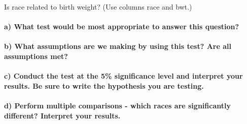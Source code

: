 \documentclass[
]{article}
\begin{document}
Is race related to birth weight? (Use columns race and bwt.)

\hypertarget{a-what-test-would-be-most-appropriate-to-answer-this-question}{%
\paragraph{a) What test would be most appropriate to answer this
question?}\label{a-what-test-would-be-most-appropriate-to-answer-this-question}}

\hypertarget{b-what-assumptions-are-we-making-by-using-this-test-are-all-assumptions-met}{%
\paragraph{b) What assumptions are we making by using this test? Are all
assumptions
met?}\label{b-what-assumptions-are-we-making-by-using-this-test-are-all-assumptions-met}}

\hypertarget{c-conduct-the-test-at-the-5-significance-level-and-interpret-your-results.-be-sure-to-write-the-hypothesis-you-are-testing.}{%
\paragraph{c) Conduct the test at the 5\% significance level and
interpret your results. Be sure to write the hypothesis you are
testing.}\label{c-conduct-the-test-at-the-5-significance-level-and-interpret-your-results.-be-sure-to-write-the-hypothesis-you-are-testing.}}

\hypertarget{d-perform-multiple-comparisons---which-races-are-significantly-different-interpret-your-results.}{%
\paragraph{d) Perform multiple comparisons - which races are
significantly different? Interpret your
results.}\label{d-perform-multiple-comparisons---which-races-are-significantly-different-interpret-your-results.}}
\end{document}

